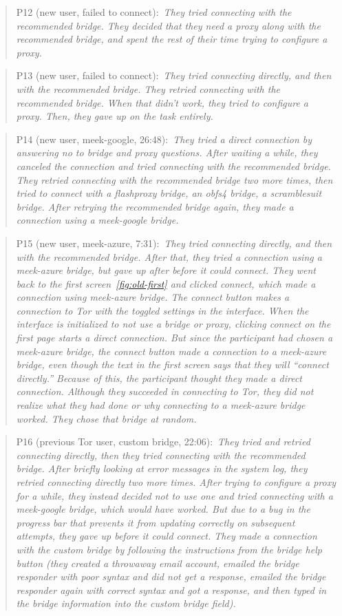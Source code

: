 \documentclass[USenglish,oneside,twocolumn]{article}
\newcommand{\pquote}[2]{
\begin{quotation}
\noindent #1:~\textit{#2}
\end{quotation}
}
\begin{document}
\pquote{P12 (new user, failed to connect)}{They tried connecting with the recommended bridge. They decided that they need a proxy along with the recommended bridge, and spent the rest of their time trying to configure a proxy.}

\pquote{P13 (new user, failed to connect)}{They tried connecting directly, and then with the recommended bridge. They retried connecting with the recommended bridge. When that didn't work, they tried to configure a proxy. Then, they gave up on the task entirely.}

\pquote{P14 (new user, meek-google, 26:48)}{They tried a direct connection by answering no to bridge and proxy questions. After waiting a while, they canceled the connection and tried connecting with the recommended bridge. They retried connecting with the recommended bridge two more times, then tried to connect with a flashproxy bridge, an obfs4 bridge, a scramblesuit bridge. After retrying the recommended bridge again, they made a connection using a meek-google bridge.}

\pquote{P15 (new user, meek-azure, 7:31)}{They tried connecting directly, and then with the recommended bridge. After that, they tried a connection using a meek-azure bridge, but gave up after before it could connect. They went back to the first screen~\ref{fig:old-first} and clicked connect, which made a connection using meek-azure bridge. The connect button makes a connection to Tor with the toggled settings in the interface. When the interface is initialized to not use a bridge or proxy, clicking connect on the first page starts a direct connection. But since the participant had chosen a meek-azure bridge, the connect button made a connection to a meek-azure bridge, even though the text in the first screen says that they will ``connect directly.'' Because of this, the participant thought they made a direct connection. Although they succeeded in connecting to Tor, they did not realize what they had done or why connecting to a meek-azure bridge worked. They chose that bridge at random.}

\pquote{P16 (previous Tor user, custom bridge, 22:06)}{They tried and retried connecting directly, then they tried connecting with the recommended bridge. After briefly looking at error messages in the system log, they retried connecting directly two more times. After trying to configure a proxy for a while, they instead decided not to use one and tried connecting with a meek-google bridge, which would have worked. But  due to a bug in the progress bar that prevents it from updating correctly on subsequent attempts, they gave up before it could connect. They made a connection with the custom bridge by following the instructions from the bridge help button (they created a throwaway email account, emailed the bridge responder with poor syntax and did not get a response, emailed the bridge responder again with correct syntax and got a response, and then typed in the bridge information into the custom bridge field).}
\end{document}
